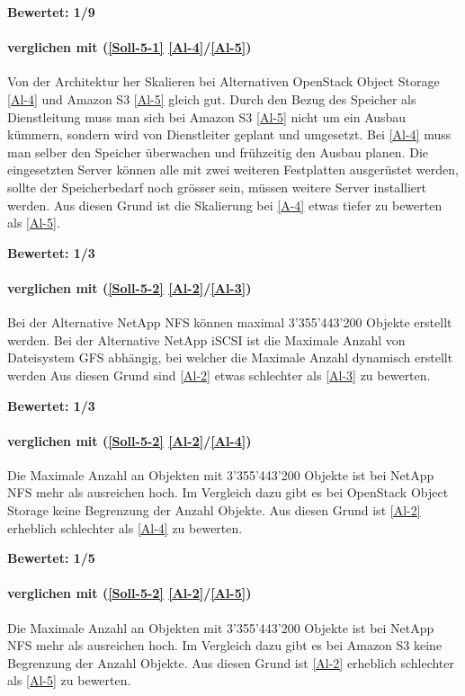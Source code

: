 \textbf{Bewertet: 1/9}

\paragraph*{  verglichen mit  (\ref{Soll-5-1} \ref{Al-4}/\ref{Al-5})}
Von der Architektur her Skalieren bei Alternativen OpenStack Object Storage \ref{Al-4} und Amazon S3 \ref{Al-5} gleich gut. Durch den Bezug des Speicher als Dienstleitung muss man sich bei Amazon S3 \ref{Al-5} nicht um ein Ausbau kümmern, sondern wird von Dienstleiter geplant und umgesetzt. Bei \ref{Al-4} muss man selber den Speicher überwachen und frühzeitig den Ausbau planen. Die eingesetzten Server können alle mit zwei weiteren Festplatten ausgerüstet werden, sollte der Speicherbedarf noch grösser sein, müssen weitere Server installiert werden. Aus diesen Grund ist die Skalierung bei \ref{A-4} etwas tiefer zu bewerten als \ref{Al-5}.

\textbf{Bewertet: 1/3}


\paragraph*{  verglichen mit  (\ref{Soll-5-2} \ref{Al-2}/\ref{Al-3})}
Bei der Alternative NetApp NFS können maximal 3'355'443'200 Objekte erstellt werden. Bei der Alternative NetApp iSCSI ist die Maximale Anzahl von Dateisystem GFS abhängig, bei welcher die Maximale Anzahl dynamisch erstellt werden Aus diesen Grund sind  \ref{Al-2} etwas schlechter als  \ref{Al-3} zu bewerten.

\textbf{Bewertet: 1/3}

\paragraph*{  verglichen mit  (\ref{Soll-5-2} \ref{Al-2}/\ref{Al-4})}
Die Maximale Anzahl an Objekten mit 3'355'443'200 Objekte ist bei NetApp NFS mehr als ausreichen hoch. Im Vergleich dazu gibt es bei OpenStack Object Storage keine Begrenzung der Anzahl Objekte. Aus diesen Grund ist  \ref{Al-2} erheblich schlechter als  \ref{Al-4} zu bewerten.

\textbf{Bewertet: 1/5}

\paragraph*{  verglichen mit  (\ref{Soll-5-2} \ref{Al-2}/\ref{Al-5})}
Die Maximale Anzahl an Objekten mit 3'355'443'200 Objekte ist bei NetApp NFS mehr als ausreichen hoch. Im Vergleich dazu gibt es bei Amazon S3 keine Begrenzung der Anzahl Objekte. Aus diesen Grund ist  \ref{Al-2} erheblich schlechter als  \ref{Al-5} zu bewerten.

